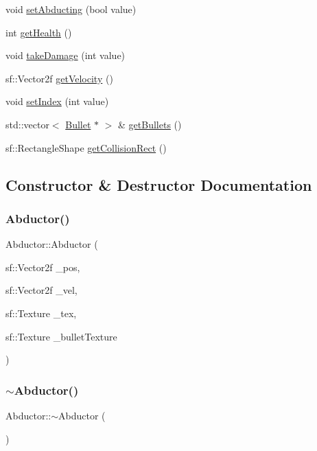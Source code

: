 \begin{DoxyCompactItemize}
\item 
void \hyperlink{class_abductor_a1069f5de8e0696be938a741f4b931855}{set\+Abducting} (bool value)
\item 
int \hyperlink{class_abductor_a6893de5e10abe1978bfae651751f2a33}{get\+Health} ()
\item 
void \hyperlink{class_abductor_aa7086d22f21d43097e7d51dd06b4b074}{take\+Damage} (int value)
\item 
sf\+::\+Vector2f \hyperlink{class_abductor_a1f26bdb461e53aa966d744100568d90c}{get\+Velocity} ()
\item 
void \hyperlink{class_abductor_a4eab3b0823078780f2129873bcd181ae}{set\+Index} (int value)
\item 
std\+::vector$<$ \hyperlink{class_bullet}{Bullet} $\ast$ $>$ \& \hyperlink{class_abductor_ac9a6ed96e2b0ffce0984656f8cff114e}{get\+Bullets} ()
\item 
sf\+::\+Rectangle\+Shape \hyperlink{class_abductor_a52e15ddbcabbe719425cdaf98c02b079}{get\+Collision\+Rect} ()
\end{DoxyCompactItemize}


\subsection{Constructor \& Destructor Documentation}
\mbox{\label{class_abductor_a2b772afe64f564d1616f2513dfdb7d3e}} 
\subsubsection{\texorpdfstring{Abductor()}{Abductor()}}
{\footnotesize\ttfamily Abductor\+::\+Abductor (\begin{DoxyParamCaption}\item[{sf\+::\+Vector2f}]{\+\_\+pos,  }\item[{sf\+::\+Vector2f}]{\+\_\+vel,  }\item[{sf\+::\+Texture}]{\+\_\+tex,  }\item[{sf\+::\+Texture}]{\+\_\+bullet\+Texture }\end{DoxyParamCaption})}

\mbox{\label{class_abductor_adc657b211a1b36c55db079caa10d9010}} 
\subsubsection{\texorpdfstring{$\sim$\+Abductor()}{~Abductor()}}
{\footnotesize\ttfamily Abductor\+::$\sim$\+Abductor (\begin{DoxyParamCaption}{ }\end{DoxyParamCaption})}



